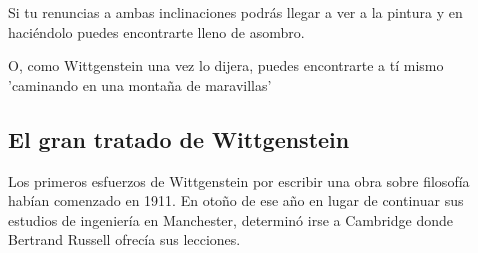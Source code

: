     Si tu renuncias a ambas inclinaciones podrás llegar a ver a la pintura y en
    haciéndolo puedes encontrarte lleno de asombro.

    O, como Wittgenstein una vez lo dijera, puedes encontrarte a tí mismo 'caminando
    en una montaña de maravillas'




    \subsection{El gran tratado de Wittgenstein}


    Los primeros esfuerzos de Wittgenstein por escribir una obra sobre filosofía
    habían comenzado en 1911. En otoño de ese año en lugar de continuar sus estudios
    de ingeniería en Manchester, determinó irse a Cambridge donde Bertrand Russell
    ofrecía sus lecciones.

